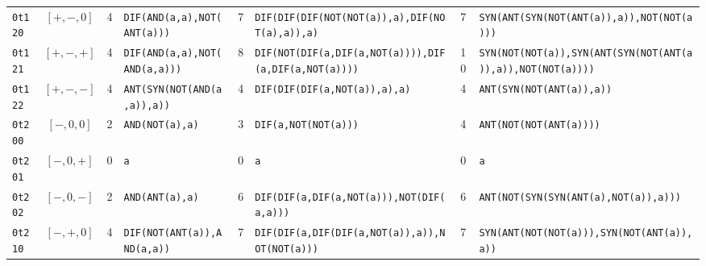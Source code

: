 \documentclass[10pt,a4paper]{article}
\begin{document}
\begin{landscape}
\begin{center}
\begin{longtable}{lcc>{\raggedright\arraybackslash}p{4.6cm}c>{\raggedright\arraybackslash}p{4.6cm}c>{\raggedright\arraybackslash}p{4.4cm}}
\texttt{0t120}&$[+,-,0]$&4&\texttt{DIF(\allowbreak AND(\allowbreak a,\allowbreak a),\allowbreak NOT(\allowbreak ANT(\allowbreak a)))}&7&\texttt{DIF(\allowbreak DIF(\allowbreak DIF(\allowbreak NOT(\allowbreak NOT(\allowbreak a)),\allowbreak a),\allowbreak DIF(\allowbreak NOT(\allowbreak a),\allowbreak a)),\allowbreak a)}&7&\texttt{SYN(\allowbreak ANT(\allowbreak SYN(\allowbreak NOT(\allowbreak ANT(\allowbreak a)),\allowbreak a)),\allowbreak NOT(\allowbreak NOT(\allowbreak a)))}\\
\texttt{0t121}&$[+,-,+]$&4&\texttt{DIF(\allowbreak AND(\allowbreak a,\allowbreak a),\allowbreak NOT(\allowbreak AND(\allowbreak a,\allowbreak a)))}&8&\texttt{DIF(\allowbreak NOT(\allowbreak DIF(\allowbreak a,\allowbreak DIF(\allowbreak a,\allowbreak NOT(\allowbreak a)))),\allowbreak DIF(\allowbreak a,\allowbreak DIF(\allowbreak a,\allowbreak NOT(\allowbreak a))))}&10&\texttt{SYN(\allowbreak NOT(\allowbreak NOT(\allowbreak a)),\allowbreak SYN(\allowbreak ANT(\allowbreak SYN(\allowbreak NOT(\allowbreak ANT(\allowbreak a)),\allowbreak a)),\allowbreak NOT(\allowbreak NOT(\allowbreak a))))}\\
\texttt{0t122}&$[+,-,-]$&4&\texttt{ANT(\allowbreak SYN(\allowbreak NOT(\allowbreak AND(\allowbreak a,\allowbreak a)),\allowbreak a))}&4&\texttt{DIF(\allowbreak DIF(\allowbreak DIF(\allowbreak a,\allowbreak NOT(\allowbreak a)),\allowbreak a),\allowbreak a)}&4&\texttt{ANT(\allowbreak SYN(\allowbreak NOT(\allowbreak ANT(\allowbreak a)),\allowbreak a))}\\
\texttt{0t200}&$[-,0,0]$&2&\texttt{AND(\allowbreak NOT(\allowbreak a),\allowbreak a)}&3&\texttt{DIF(\allowbreak a,\allowbreak NOT(\allowbreak NOT(\allowbreak a)))}&4&\texttt{ANT(\allowbreak NOT(\allowbreak NOT(\allowbreak ANT(\allowbreak a))))}\\
\texttt{0t201}&$[-,0,+]$&0&\texttt{a}&0&\texttt{a}&0&\texttt{a}\\
\texttt{0t202}&$[-,0,-]$&2&\texttt{AND(\allowbreak ANT(\allowbreak a),\allowbreak a)}&6&\texttt{DIF(\allowbreak DIF(\allowbreak a,\allowbreak DIF(\allowbreak a,\allowbreak NOT(\allowbreak a))),\allowbreak NOT(\allowbreak DIF(\allowbreak a,\allowbreak a)))}&6&\texttt{ANT(\allowbreak NOT(\allowbreak SYN(\allowbreak SYN(\allowbreak ANT(\allowbreak a),\allowbreak NOT(\allowbreak a)),\allowbreak a)))}\\
\texttt{0t210}&$[-,+,0]$&4&\texttt{DIF(\allowbreak NOT(\allowbreak ANT(\allowbreak a)),\allowbreak AND(\allowbreak a,\allowbreak a))}&7&\texttt{DIF(\allowbreak DIF(\allowbreak a,\allowbreak DIF(\allowbreak DIF(\allowbreak a,\allowbreak NOT(\allowbreak a)),\allowbreak a)),\allowbreak NOT(\allowbreak NOT(\allowbreak a)))}&7&\texttt{SYN(\allowbreak ANT(\allowbreak NOT(\allowbreak NOT(\allowbreak a))),\allowbreak SYN(\allowbreak NOT(\allowbreak ANT(\allowbreak a)),\allowbreak a))}\\

\end{longtable}
\end{center}
\end{landscape}
\end{document}
